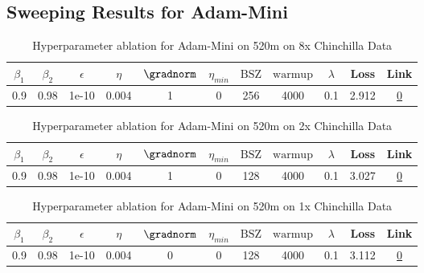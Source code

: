 \subsection{Sweeping Results for Adam-Mini}%
\begin{table}[H]
\centering
\caption{Hyperparameter ablation for Adam-Mini on 520m on 8x Chinchilla Data}
\label{tab:ablation_adam-mini_520m_8}
\begin{tabular}{ccccccccccc}
\toprule
$\beta_1$ & $\beta_2$ & $\epsilon$ & $\eta$ & $\gradnorm$ & $\eta_{min}$ & $\mathrm{BSZ}$ & $\mathrm{warmup}$ & $\lambda$ & Loss & Link \\
\midrule
0.9 & 0.98 & 1e-10 & 0.004 & 1 & 0 & 256 & 4000 & 0.1 & 2.912 & \href{https://wandb.ai/stanford-mercury/optimizer-scaling/runs/sweep-520m-85B-minidfe5aclr0.004-wd0.1-minlr0-warmup4000-b10.9-b-a76572}{0} \\
\midrule
\bottomrule
\end{tabular}
\end{table}

\begin{table}[H]
\centering
\caption{Hyperparameter ablation for Adam-Mini on 520m on 2x Chinchilla Data}
\label{tab:ablation_adam-mini_520m_2}
\begin{tabular}{ccccccccccc}
\toprule
$\beta_1$ & $\beta_2$ & $\epsilon$ & $\eta$ & $\gradnorm$ & $\eta_{min}$ & $\mathrm{BSZ}$ & $\mathrm{warmup}$ & $\lambda$ & Loss & Link \\
\midrule
0.9 & 0.98 & 1e-10 & 0.004 & 1 & 0 & 128 & 4000 & 0.1 & 3.027 & \href{https://wandb.ai/stanford-mercury/optimizer-scaling/runs/sweep-520m-21B-mini4e584elr0.004-wd0.1-minlr0-warmup4000-b10.9-b-eceb71}{0} \\
\midrule
\bottomrule
\end{tabular}
\end{table}

\begin{table}[H]
\centering
\caption{Hyperparameter ablation for Adam-Mini on 520m on 1x Chinchilla Data}
\label{tab:ablation_adam-mini_520m_1}
\begin{tabular}{ccccccccccc}
\toprule
$\beta_1$ & $\beta_2$ & $\epsilon$ & $\eta$ & $\gradnorm$ & $\eta_{min}$ & $\mathrm{BSZ}$ & $\mathrm{warmup}$ & $\lambda$ & Loss & Link \\
\midrule
0.9 & 0.98 & 1e-10 & 0.004 & 0 & 0 & 128 & 4000 & 0.1 & 3.112 & \href{https://wandb.ai/stanford-mercury/optimizer-scaling/runs/sweep-520m-10B-mini9187d7lr0.004-wd0.1-minlr0-warmup4000-b10.9-b-398e5f}{0} \\
\midrule
\bottomrule
\end{tabular}
\end{table}

